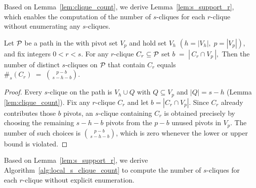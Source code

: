 


Based on Lemma~\ref{lem:clique_count}, we derive Lemma~\ref{lem:s_support_r}, which enables the computation of the number of $s$-cliques for each $r$-clique without enumerating any $s$-cliques.

\begin{lemma}
\label{lem:s_support_r}
Let $\TPath{}$ be a path in the \cpi with
pivot set $V_{p}$ and hold set $V_{h}$
$(h=|V_{h}|,\;p=|V_{p}|)$,
and fix integers $0<r<s$.
For any $r$-clique $C_r\subseteq\TPath{}$ set
$b \;=\; |\,C_r\cap V_{p}\,|,$
Then the number of distinct $s$-cliques on $\TPath{}$ that contain
$C_r$ equals
$
\#_{s}(C_r)
\;=\;
\binom{p-b}{\,s-h-b}.
$
\end{lemma}

\begin{proof}
Every $s$-clique on the path is
$V_h\cup Q$ with $Q\subseteq V_p$ and $|Q|=s-h$
(Lemma \ref{lem:clique_count}).
Fix any $r$-clique $C_r$ and let $b=|C_r\cap V_p|$.
Since $C_r$ already contributes those $b$ pivots,
an $s$-clique containing $C_r$ is obtained precisely by choosing the
remaining $s-h-b$ pivots from the $p-b$ unused pivots in $V_p$.
The number of such choices is
$\binom{p-b}{\,s-h-b}$,
which is zero whenever the lower or upper bound is violated.
\end{proof}

% 

Based on Lemma~\ref{lem:s_support_r}, we derive Algorithm~\ref{alg:local_s_clique_count} to compute the number of $s$-cliques for each $r$-clique without explicit enumeration.

